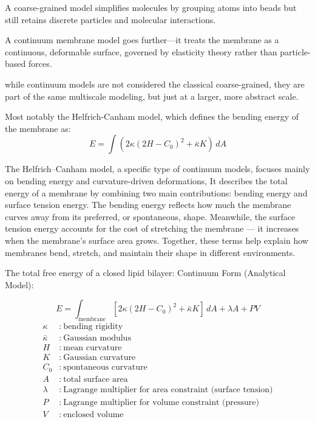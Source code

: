 \documentclass[12pt]{article}
\begin{document}
\begin{flushleft}
A coarse-grained model simplifies molecules by grouping atoms into beads but still retains discrete particles and molecular interactions.

A continuum membrane model goes further—it treats the membrane as a continuous, deformable surface, governed by elasticity theory rather than particle-based forces.

while continuum models are not considered the classical coarse-grained, they are part of the same multiscale modeling, but just at a larger, more abstract scale.

Most notably the Helfrich-Canham model, which defines the bending energy of the membrane as:
\begin{equation}
E = \int \left( 2\kappa (2H - C_0)^2 + \bar{\kappa} K \right) \, dA
\end{equation}





The Helfrich–Canham model, a specific type of continuum models, focuses mainly on bending energy and curvature-driven deformations, It describes the total energy of a membrane by combining two main contributions: bending energy and surface tension energy. The bending energy reflects how much the membrane curves away from its preferred, or spontaneous, shape. Meanwhile, the surface tension energy accounts for the cost of stretching the membrane — it increases when the membrane's surface area grows. Together, these terms help explain how membranes bend, stretch, and maintain their shape in different environments.


The total free energy of a closed lipid bilayer:
Continuum Form (Analytical Model):

\begin{equation}
E = \int_{\text{membrane}} \left[ 2\kappa (2H - C_0)^2 + \bar{\kappa} K \right] \, dA + \lambda A + PV
\end{equation}
\begin{align*}
\kappa &:\ \text{bending rigidity} \\
\bar{\kappa} &:\ \text{Gaussian modulus} \\
H &:\ \text{mean curvature} \\
K &:\ \text{Gaussian curvature} \\
C_0 &:\ \text{spontaneous curvature} \\
A &:\ \text{total surface area} \\
\lambda &:\ \text{Lagrange multiplier for area constraint (surface tension)} \\
P &:\ \text{Lagrange multiplier for volume constraint (pressure)}\\
V &:\ \text{enclosed volume} 
\end{align*}


\end{flushleft}
\end{document}
